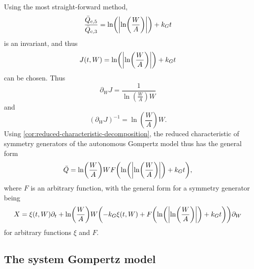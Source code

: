 Using the most straight-forward method,
\begin{equation*}
  \frac{\bar{Q}_{\text{c},5}}{\bar{Q}_{\text{c},3}} = \ln\left(\abs{\ln\left(\frac{W}{A}\right)}\right) + k_G t
\end{equation*}
is an invariant, and thus
\begin{equation*}
  J(t, W) = \ln\left(\abs{\ln\left(\frac{W}{A}\right)}\right) + k_G t
\end{equation*}
can be chosen.
Thus
\begin{equation*}
  \partial_W J = \frac{1}{\ln\left(\frac{W}{A}\right) W}
\end{equation*}
and
\begin{equation*}
  \left(\partial_W J\right)^{-1} = \ln\left(\frac{W}{A}\right) W.
\end{equation*}
Using \cref{cor:reduced-characteristic-decomposition}, the reduced characteristic of symmetry generators of the autonomous Gompertz model thus has the general form
\begin{equation} \label{eq:general-autonomous-gompertz-characteristic}
  \bar{Q} = \ln\left(\frac{W}{A}\right) W F\left(\ln\left(\abs{\ln\left(\frac{W}{A}\right)}\right) + k_G t\right),
\end{equation}
where \(F\) is an arbitrary function, with the general form for a symmetry generator being
\begin{equation} \label{eq:general-autonomous-gompertz-symmetry}
  X = \xi(t, W) \partial_t + \ln\left(\frac{W}{A}\right) W \left(-k_G \xi(t, W) + F\left(\ln\left(\abs{\ln\left(\frac{W}{A}\right)}\right) + k_G t\right)\right) \partial_W
\end{equation}
for arbitrary functions \(\xi\) and \(F\).

\subsection{The system Gompertz model}

